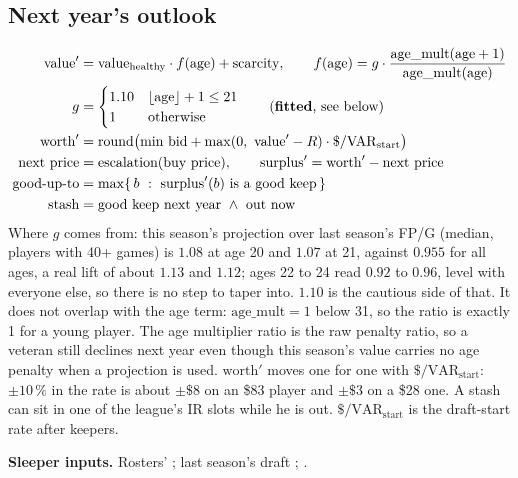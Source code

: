 \documentclass[10pt]{article}
\newcommand{\api}[1]{\texttt{\detokenize{#1}}}
\newcommand{\sleeper}[1]{\par\textbf{Sleeper inputs.} #1}
\begin{document}
\subsection{Next year's outlook}
\begin{align}
\text{value}' &= \text{value}_{\text{healthy}}\cdot f(\text{age}) + \text{scarcity},\qquad
f(\text{age})=g\cdot\frac{\mathrm{age\_mult}(\text{age}+1)}{\mathrm{age\_mult}(\text{age})}\\
g &= \begin{cases}1.10 & \lfloor\text{age}\rfloor+1\le 21\\ 1&\text{otherwise}\end{cases}\qquad(\text{\textbf{fitted}, see below})\\
\text{worth}' &= \mathrm{round}\big(\text{min bid} + \max(0,\ \text{value}'-R)\cdot\$/\mathrm{VAR}_{\text{start}}\big)\\
\text{next price} &= \text{escalation}(\text{buy price}),\qquad \text{surplus}'=\text{worth}'-\text{next price}\\
\text{good-up-to} &= \max\{\,b\ :\ \text{surplus}'(b)\ \text{is a good keep}\,\}\\
\text{stash} &= \text{good keep next year}\ \wedge\ \text{out now}
\end{align}
Where $g$ comes from: this season's projection over last season's FP/G (median, players with 40+ games) is $1.08$ at
age 20 and $1.07$ at 21, against $0.955$ for all ages, a real lift of about $1.13$ and $1.12$; ages 22 to 24 read
$0.92$ to $0.96$, level with everyone else, so there is no step to taper into. $1.10$ is the cautious side of that.
It does not overlap with the age term: $\mathrm{age\_mult}=1$ below 31, so the ratio is exactly 1 for a young player.
The age multiplier ratio is the raw penalty ratio, so a veteran still declines next year even though this season's value
carries no age penalty when a projection is used. $\text{worth}'$ moves one for one with $\$/\mathrm{VAR}_{\text{start}}$:
$\pm10\,\%$ in the rate is about $\pm\$8$ on an \$83 player and $\pm\$3$ on a \$28 one. A stash can sit in one of the
league's IR slots while he is out. $\$/\mathrm{VAR}_{\text{start}}$ is the draft-start rate after keepers.
\sleeper{Rosters' \api{keepers}; last season's draft \api{metadata.amount}; \api{age}.}
\end{document}
